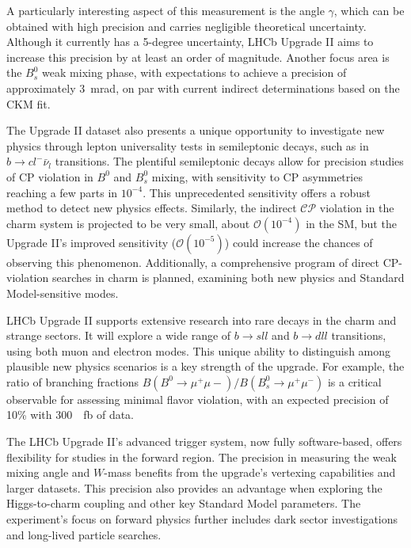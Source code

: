 A particularly interesting aspect of this measurement is the angle $\gamma$, which can be obtained with high precision and carries negligible theoretical uncertainty. Although it currently has a 5-degree uncertainty, LHCb Upgrade II aims to increase this precision by at least an order of magnitude. Another focus area is the $B_s^0$ weak mixing phase, with expectations to achieve a precision of approximately \SI{3}{\milli\radian}, on par with current indirect determinations based on the CKM fit.

The Upgrade II dataset also presents a unique opportunity to investigate new physics through lepton universality tests in semileptonic decays, such as in $b\rightarrow c l^-\bar{\nu}_l$ transitions. The plentiful semileptonic decays allow for precision studies of CP violation in $B^0$ and $B^0_s$ mixing, with sensitivity to CP asymmetries reaching a few parts in $10^{−4}$. This unprecedented sensitivity offers a robust method to detect new physics effects. Similarly, the indirect $\mathcal{CP}$ violation in the charm system is projected to be very small, about $\mathcal{O}(10^{-4})$ in the SM, but the Upgrade II's improved sensitivity ($\mathcal{O}(10^{−5})$) could increase the chances of observing this phenomenon. Additionally, a comprehensive program of direct CP-violation searches in charm is planned, examining both new physics and Standard Model-sensitive modes.

LHCb Upgrade II supports extensive research into rare decays in the charm and strange sectors. It will explore a wide range of $b\rightarrow s ll$ and $b\rightarrow d ll$ transitions, using both muon and electron modes. This unique ability to distinguish among plausible new physics scenarios is a key strength of the upgrade. For example, the ratio of branching fractions $B(B^0\rightarrow \mu^+\mu-)/B(B^0_s\rightarrow \mu^+\mu^-)$ is a critical observable for assessing minimal flavor violation, with an expected precision of 10\% with \SI{300}{\per\femto\barn} of data.

The LHCb Upgrade II's advanced trigger system, now fully software-based, offers flexibility for studies in the forward region. The precision in measuring the weak mixing angle and $W$-mass benefits from the upgrade's vertexing capabilities and larger datasets. This precision also provides an advantage when exploring the Higgs-to-charm coupling and other key Standard Model parameters. The experiment's focus on forward physics further includes dark sector investigations and long-lived particle searches.

